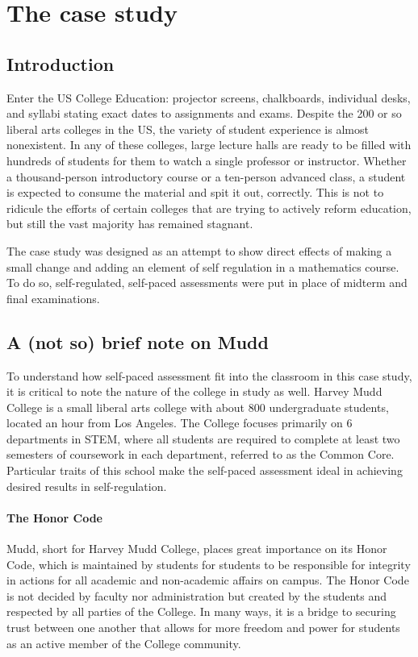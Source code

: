 \chapter{The case study}
\section{Introduction}

Enter the US College Education: projector screens, chalkboards, individual desks, and syllabi stating exact dates to assignments and exams. Despite the 200 or so liberal arts colleges in the US, the variety of student experience is almost nonexistent. In any of these colleges, large lecture halls are ready to be filled with hundreds of students for them to watch a single professor or instructor. Whether a thousand-person introductory course or a ten-person advanced class, a student is expected to consume the material and spit it out, correctly. This is not to ridicule the efforts of certain colleges that are trying to actively reform education, but still the vast majority has remained stagnant.

The case study was designed as an attempt to show direct effects of making a small change and adding an element of self regulation in a mathematics course. To do so, self-regulated, self-paced assessments were put in place of midterm and final examinations.

\section{A (not so) brief note on Mudd}
To understand how self-paced assessment fit into the classroom in this case study, it is critical to note the nature of the college in study as well. Harvey Mudd College is a small liberal arts college with about 800 undergraduate students, located an hour from Los Angeles. The College focuses primarily on 6 departments in STEM, where all students are required to complete at least two semesters of coursework in each department, referred to as the Common Core. Particular traits of this school make the self-paced assessment ideal in achieving desired results in self-regulation.

\subsubsection{The Honor Code}
Mudd, short for Harvey Mudd College, places great importance on its Honor Code, which is maintained by students for students to be responsible for integrity in actions for all academic and non-academic affairs on campus. The Honor Code is not decided by faculty nor administration but created by the students and respected by all parties of the College. In many ways, it is a bridge to securing trust between one another that allows for more freedom and power for students as an active member of the College community.

